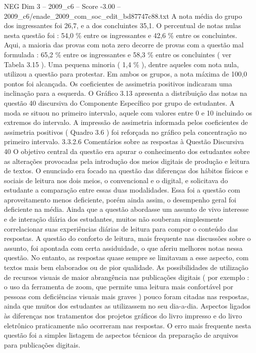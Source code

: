 \begin{textsample}{NEG Dim 3 – 2009\_c6 – Score -3.00 – 2009\_c6/enade\_2009\_com\_soc\_edit\_bd87747c88.txt}
A nota média do grupo dos ingressantes foi 26,7, e a dos concluintes 35,1.
O percentual de notas nulas nesta questão foi : 54,0 \% entre os ingressantes e 42,6 \% entre os concluintes.
Aqui, a maioria das provas com nota zero decorre de provas com a questão mal formulada : 65,2 \% entre os ingressantes e 58,3 \% entre os concluintes ( ver Tabela 3.15 ).
Uma pequena minoria ( 1,4 \% ), dentre aqueles com nota nula, utilizou a questão para protestar.
Em ambos os grupos, a nota máxima de 100,0 pontos foi alcançada.
Os coeficientes de assimetria positivos indicaram uma inclinação para a esquerda.
O Gráfico 3.13 apresenta a distribuição das notas na questão 40 discursiva do Componente Específico por grupo de estudantes.
A moda se situou no primeiro intervalo, aquele com valores entre 0 e 10 incluindo os extremos do intervalo.
A impressão de assimetria informada pelos coeficientes de assimetria positivos ( Quadro 3.6 ) foi reforçada no gráfico pela concentração no primeiro intervalo. 3.3.2.6 Comentários sobre as respostas à Questão Discursiva 40 O objetivo central da questão era apurar o conhecimento dos estudantes sobre as alterações provocadas pela introdução dos meios digitais de produção e leitura de textos.
O enunciado era focado na questão das diferenças dos hábitos físicos e sociais de leitura nos dois meios, o convencional e o digital, e solicitava do estudante a comparação entre essas duas modalidades.
Essa foi a questão com aproveitamento menos deficiente, porém ainda assim, o desempenho geral foi deficiente na média.
Ainda que a questão abordasse um assunto de vivo interesse e de interação diária dos estudantes, muitos não souberam simplesmente correlacionar suas experiências diárias de leitura para compor o conteúdo das respostas.
A questão do conforto de leitura, mais frequente nas discussões sobre o assunto, foi apontada com certa assiduidade, o que aferiu melhores notas nessa questão.
No entanto, as respostas quase sempre se limitavam a esse aspecto, com textos mais bem elaborados ou de pior qualidade.
As possibilidades de utilização de recursos visuais de maior abrangência nas publicações digitais ( por exemplo : o uso da ferramenta de zoom, que permite uma leitura mais confortável por pessoas com deficiências visuais mais graves ) pouco foram citadas nas respostas, ainda que muitos dos estudantes as utilizassem no seu dia-a-dia.
Aspectos ligados às diferenças nos tratamentos dos projetos gráficos do livro impresso e do livro eletrônico praticamente não ocorreram nas respostas.
O erro mais frequente nesta questão foi a simples listagem de aspectos técnicos da preparação de arquivos para publicações digitais.

\end{textsample}

